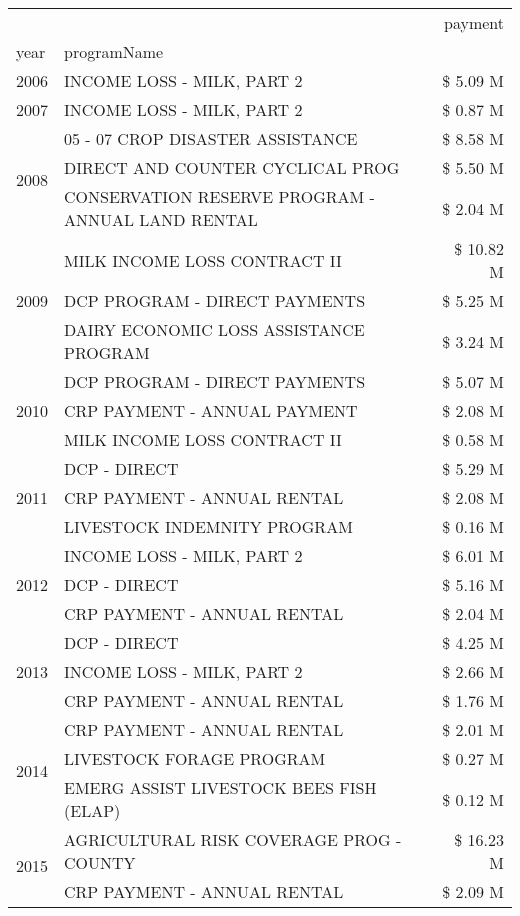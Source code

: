 \begin{tabular}{llr}
\toprule
 &  & payment \\
year & programName &  \\
\midrule
2006 & INCOME LOSS - MILK, PART 2 & \$ 5.09 M \\
\cline{1-3}
2007 & INCOME LOSS - MILK, PART 2 & \$ 0.87 M \\
\cline{1-3}
\multirow[t]{3}{*}{2008} & 05 - 07 CROP DISASTER ASSISTANCE & \$ 8.58 M \\
 & DIRECT AND COUNTER CYCLICAL PROG & \$ 5.50 M \\
 & CONSERVATION RESERVE PROGRAM - ANNUAL LAND RENTAL & \$ 2.04 M \\
\cline{1-3}
\multirow[t]{3}{*}{2009} & MILK INCOME LOSS CONTRACT II & \$ 10.82 M \\
 & DCP PROGRAM - DIRECT PAYMENTS & \$ 5.25 M \\
 & DAIRY ECONOMIC LOSS ASSISTANCE PROGRAM & \$ 3.24 M \\
\cline{1-3}
\multirow[t]{3}{*}{2010} & DCP PROGRAM - DIRECT PAYMENTS & \$ 5.07 M \\
 & CRP PAYMENT - ANNUAL PAYMENT & \$ 2.08 M \\
 & MILK INCOME LOSS CONTRACT II & \$ 0.58 M \\
\cline{1-3}
\multirow[t]{3}{*}{2011} & DCP - DIRECT & \$ 5.29 M \\
 & CRP PAYMENT - ANNUAL RENTAL & \$ 2.08 M \\
 & LIVESTOCK INDEMNITY PROGRAM & \$ 0.16 M \\
\cline{1-3}
\multirow[t]{3}{*}{2012} & INCOME LOSS - MILK, PART 2 & \$ 6.01 M \\
 & DCP - DIRECT & \$ 5.16 M \\
 & CRP PAYMENT - ANNUAL RENTAL & \$ 2.04 M \\
\cline{1-3}
\multirow[t]{3}{*}{2013} & DCP - DIRECT & \$ 4.25 M \\
 & INCOME LOSS - MILK, PART 2 & \$ 2.66 M \\
 & CRP PAYMENT - ANNUAL RENTAL & \$ 1.76 M \\
\cline{1-3}
\multirow[t]{3}{*}{2014} & CRP PAYMENT - ANNUAL RENTAL & \$ 2.01 M \\
 & LIVESTOCK FORAGE PROGRAM & \$ 0.27 M \\
 & EMERG ASSIST LIVESTOCK BEES FISH (ELAP) & \$ 0.12 M \\
\cline{1-3}
\multirow[t]{3}{*}{2015} & AGRICULTURAL RISK COVERAGE PROG - COUNTY & \$ 16.23 M \\
 & CRP PAYMENT - ANNUAL RENTAL & \$ 2.09 M \\

\end{tabular}
